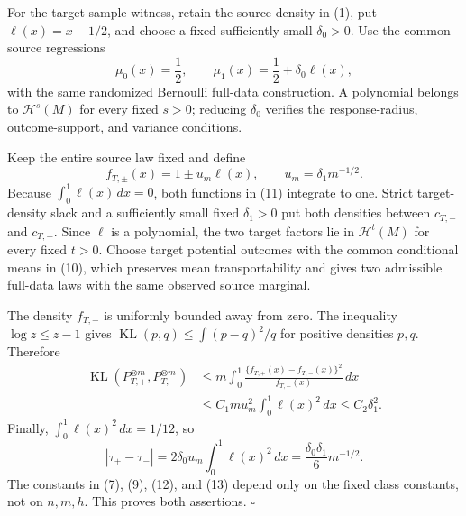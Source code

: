 For the target-sample witness, retain the source density in (1), put \(\ell(x)=x-1/2\), and choose a fixed sufficiently small \(\delta_0>0\).  Use the common source regressions
\[
\mu_0(x)=\frac12,
\qquad
\mu_1(x)=\frac12+\delta_0\ell(x),
\tag{10}
\]
with the same randomized Bernoulli full-data construction.  A polynomial belongs to \(\mathcal H^s(M)\) for every fixed \(s>0\); reducing \(\delta_0\) verifies the response-radius, outcome-support, and variance conditions.

Keep the entire source law fixed and define
\[
f_{T,\pm}(x)=1\pm u_m\ell(x),
\qquad
u_m=\delta_1m^{-1/2}.
\tag{11}
\]
Because \(\int_0^1\ell(x)\,dx=0\), both functions in (11) integrate to one.  Strict target-density slack and a sufficiently small fixed \(\delta_1>0\) put both densities between \(c_{T,-}\) and \(c_{T,+}\).  Since \(\ell\) is a polynomial, the two target factors lie in \(\mathcal H^t(M)\) for every fixed \(t>0\).  Choose target potential outcomes with the common conditional means in (10), which preserves mean transportability and gives two admissible full-data laws with the same observed source marginal.

The density \(f_{T,-}\) is uniformly bounded away from zero.  The inequality \(\log z\le z-1\) gives \(\operatorname{KL}(p,q)\le\int(p-q)^2/q\) for positive densities \(p,q\).  Therefore
\[
\begin{aligned}
\operatorname{KL}(P_{T,+}^{\otimes m},P_{T,-}^{\otimes m})
&\le m\int_0^1
\frac{\{f_{T,+}(x)-f_{T,-}(x)\}^2}{f_{T,-}(x)}\,dx\\
&\le C_1 m u_m^2\int_0^1\ell(x)^2\,dx
\le C_2\delta_1^2.
\end{aligned}
\tag{12}
\]
Finally, \(\int_0^1\ell(x)^2\,dx=1/12\), so
\[
|\tau_+-\tau_-|
=2\delta_0u_m\int_0^1\ell(x)^2\,dx
=\frac{\delta_0\delta_1}{6}m^{-1/2}.
\tag{13}
\]
The constants in (7), (9), (12), and (13) depend only on the fixed class constants, not on \(n,m,h\).  This proves both assertions. \(\square\)